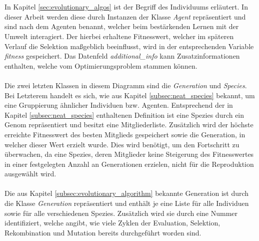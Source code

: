 \\\\
In Kapitel \ref{sec:evolutionary_algos} ist der Begriff des Individuums erläutert. In dieser Arbeit werden diese durch Instanzen der Klasse \emph{Agent} repräsentiert und sind nach dem Agenten benannt, welcher beim bestärkenden Lernen mit der Umwelt interagiert. Der hierbei erhaltene Fitnesswert, welcher im späteren Verlauf die Selektion maßgeblich beeinflusst, wird in der entsprechenden Variable \emph{fitness} gespeichert. Das Datenfeld \emph{additional\_info} kann Zusatzinformationen enthalten, welche vom Optimierungsproblem stammen können.
\\\\
Die zwei letzten Klassen in diesem Diagramm sind die \emph{Generation} und \emph{Species}. Bei Letzterem handelt es sich, wie aus Kapitel \ref{subsec:neat_species} bekannt, um eine Gruppierung ähnlicher Individuen bzw. Agenten. Entsprechend der in Kapitel \ref{subsec:neat_species} enthaltenen Definition ist eine Spezies durch ein Genom repräsentiert und besitzt eine Mitgliederliste. Zusätzlich wird der höchste erreichte Fitnesswert des besten Mitglieds gespeichert sowie die Generation, in welcher dieser Wert erzielt wurde. Dies wird benötigt, um den Fortschritt zu überwachen, da eine Spezies, deren Mitglieder keine Steigerung des Fitnesswertes in einer festgelegten Anzahl an Generationen erzielen, nicht für die Reproduktion ausgewählt wird.
\\\\
Die aus Kapitel \ref{subsec:evolutionary_algorithm} bekannte Generation ist durch die Klasse \emph{Generation} repräsentiert und enthält je eine Liste für alle Individuen sowie für alle verschiedenen Spezies. Zusätzlich wird sie durch eine Nummer identifiziert, welche angibt, wie viele Zyklen der Evaluation, Selektion, Rekombination und Mutation bereits durchgeführt worden sind.


